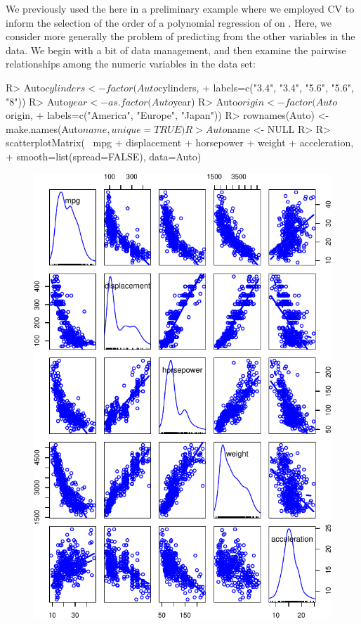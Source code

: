 \documentclass[
]{jss}
\begin{document}
We previously used the  here in a preliminary example where
we employed CV to inform the selection of the order of a polynomial
regression of  on . Here, we consider more
generally the problem of predicting  from the other variables
in the  data. We begin with a bit of data management, and
then examine the pairwise relationships among the numeric variables in
the data set:

\begin{CodeChunk}
\begin{CodeInput}
R> Auto$cylinders <- factor(Auto$cylinders,
+                          labels=c("3.4", "3.4", "5.6", "5.6", "8"))
R> Auto$year <- as.factor(Auto$year)
R> Auto$origin <- factor(Auto$origin,
+                       labels=c("America", "Europe", "Japan"))
R> rownames(Auto) <- make.names(Auto$name, unique=TRUE)
R> Auto$name <- NULL
R> 
R> scatterplotMatrix(~ mpg + displacement + horsepower + weight + acceleration, 
+                   smooth=list(spread=FALSE), data=Auto)
\end{CodeInput}
\begin{figure}

{\centering \includegraphics[width=1\linewidth]{JSS-article_files/figure-latex/Auto-explore-1} 

}
\end{figure}
\end{CodeChunk}
\end{document}
